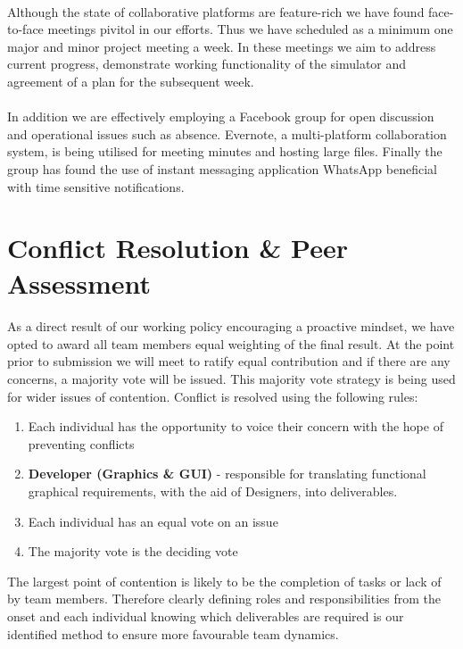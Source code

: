 \documentclass[11pt,a4paper]{article}
\begin{document}
\paragraph{}
Although the state of collaborative platforms are feature-rich we have found face-to-face meetings pivitol in our efforts.  Thus we have scheduled as a minimum one major and minor project meeting a week.  In these meetings we aim to address current progress, demonstrate working functionality of the simulator and agreement of a plan for the subsequent week.
\paragraph{}
In addition we are effectively employing a Facebook group for open discussion and operational issues such as absence.  Evernote, a multi-platform collaboration system, is being utilised for meeting minutes and hosting large files.  Finally the group has found the use of instant messaging application WhatsApp beneficial with time sensitive notifications.

\section{Conflict Resolution \& Peer Assessment}
\paragraph{}
As a direct result of our working policy encouraging a proactive mindset, we have opted to award all team members equal weighting of the final result.  At the point prior to submission we will meet to ratify equal contribution and if there are any concerns, a majority vote will be issued.
This majority vote strategy is being used for wider issues of contention.  Conflict is resolved using the following rules:

\begin{enumerate}
  \item Each individual has the opportunity to voice their concern with the hope of preventing conflicts
  \item \textbf{Developer (Graphics \& GUI)} - responsible for translating functional graphical requirements, with the aid of Designers, into deliverables.
  \item Each individual has an equal vote on an issue
  \item The majority vote is the deciding vote
\end{enumerate}

The largest point of contention is likely to be the completion of tasks or lack of by team members.  Therefore clearly defining roles and responsibilities from the onset and each individual knowing which deliverables are required is our identified method to ensure more favourable team dynamics.
\end{document}
